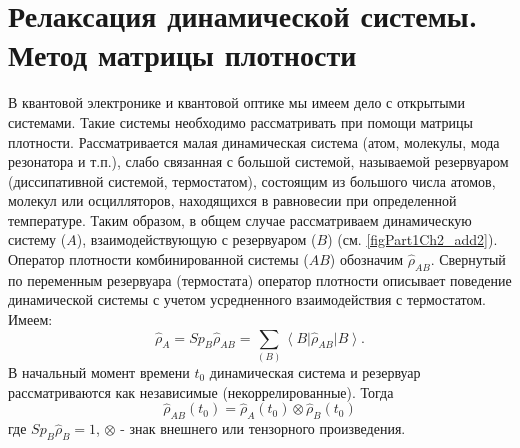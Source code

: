 \section{Релаксация динамической системы. Метод матрицы плотности}
В квантовой электронике и квантовой оптике мы имеем дело с открытыми
системами. Такие системы необходимо рассматривать при помощи
матрицы плотности. Рассматривается малая динамическая система
(атом, молекулы, мода резонатора и т.п.), слабо связанная с
большой системой, называемой резервуаром (диссипативной
системой, термостатом), состоящим из большого числа атомов,
молекул или осцилляторов, находящихся в равновесии при
определенной температуре. Таким образом, в общем случае
рассматриваем динамическую систему ($A$), взаимодействующую с
резервуаром ($B$) (см. \autoref{figPart1Ch2_add2}). Оператор
плотности комбинированной системы ($AB$) обозначим $\hat{\rho}_{AB}$.
Свернутый по переменным резервуара (термостата) оператор плотности
описывает поведение динамической системы с учетом усредненного
взаимодействия с термостатом. Имеем: 
\begin{equation}
\hat{\rho}_{A} = Sp_{B} \hat{\rho}_{AB} = 
\sum_{\left(B\right)}
\left<B\right|\hat{\rho}_{AB}\left|B\right>.
\end{equation}
В начальный момент времени $t_0$ динамическая система и резервуар
рассматриваются как независимые (некоррелированные). Тогда 
\begin{equation}
\hat{\rho}_{AB}\left(t_0\right) = 
\hat{\rho}_{A}\left(t_0\right)
\otimes
\hat{\rho}_{B}\left(t_0\right)
\end{equation}
где  $Sp_B \hat{\rho}_{B} = 1$, $\otimes$ - знак внешнего или
тензорного произведения.  



